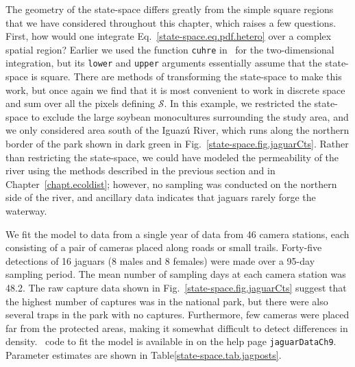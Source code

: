 The geometry of the state-space differs greatly from the simple square
regions that we have considered throughout this chapter, which raises
a few questions. First, how would one integrate
Eq.~\ref{state-space.eq.pdf.hetero} over a
complex spatial region? Earlier we used the function \verb+cuhre+ in
\R~for the two-dimensional integration, but its \verb+lower+ and
\verb+upper+ arguments essentially assume that the state-space is
square. There are methods of transforming the state-space to make this
work, but once again we find that it is most convenient to work in
discrete space and sum over all the pixels defining
$\mathcal{S}$. In this example, we restricted the state-space to exclude the large
soybean monocultures surrounding the study area, and we only
considered area south of the Iguaz\'{u} River, which runs along the northern border
of the park shown in dark green in
Fig.~\ref{state-space.fig.jaguarCts}. Rather than restricting the
state-space, we could have modeled the permeability of the river using
the methods described in the previous section and in
Chapter~\ref{chapt.ecoldist}; however, no sampling was conducted on
the northern side of the river, and ancillary data indicates that
jaguars rarely forge the waterway.

We fit the model to data from a single year of data from 46
camera stations, each consisting of a pair of cameras placed along
roads or small trails. Forty-five detections of 16 jaguars (8 males and 8
females) were made over a 95-day sampling period. The mean number of
sampling days at each camera station was 48.2. The raw capture data
shown in Fig.~\ref{state-space.fig.jaguarCts} suggest that the highest
number of captures was in the national park, but there were also
several traps in the park with no captures. Furthermore, few cameras
were placed far from the protected areas, making it somewhat difficult
to detect differences in density. \R~code to fit the model is
available in \scrbook  on the help page \verb+jaguarDataCh9+.
Parameter estimates are shown in Table\ref{state-space.tab.jagposts}.




